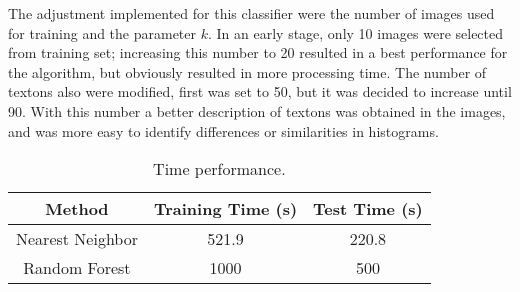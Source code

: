 \documentclass[10pt,twocolumn,letterpaper]{article}
\begin{document}
The adjustment implemented for this classifier were the number of images used for training and the parameter $k$. In an early stage, only 10 images were selected from training set; increasing this number to 20 resulted in a best performance for the algorithm, but obviously resulted in more processing time. The number of textons also were modified, first was set to 50, but it was decided to increase until 90. With this number a better description of textons was obtained in the images, and was more easy to identify differences or similarities in histograms.
\begin{table}[h]
\centering
\caption{\label{time} Time performance.}
\begin{tabular}{|c|c|c|}
\hline
\textbf{Method} & \textbf{Training Time (s)} & \textbf{Test Time (s)}\\
\hline
Nearest Neighbor & 521.9 & 220.8\\
\hline
Random Forest & 1000 & 500\\
\hline
\end{tabular}
\end{table}
\end{document}
